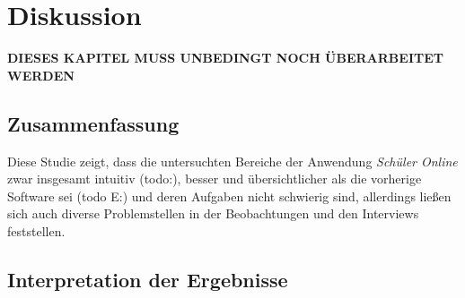 \section{Diskussion}

\textbf{DIESES KAPITEL MUSS UNBEDINGT NOCH ÜBERARBEITET WERDEN}

\subsection{Zusammenfassung}
Diese Studie zeigt, dass die untersuchten Bereiche der Anwendung \textit{Schüler Online} zwar insgesamt intuitiv (todo:), besser und übersichtlicher als die vorherige Software sei (todo E:) und deren Aufgaben nicht schwierig sind, allerdings ließen sich auch diverse Problemstellen in der Beobachtungen und den Interviews feststellen. 

%

\subsection{Interpretation der Ergebnisse}

